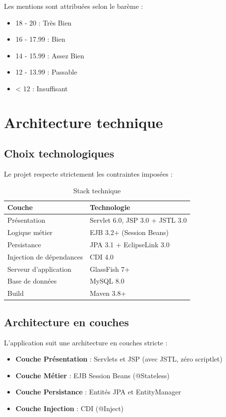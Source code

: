 \documentclass[12pt,a4paper]{report}
\begin{document}
Les mentions sont attribuées selon le barème :
\begin{itemize}
    \item 18 - 20 : Très Bien
    \item 16 - 17.99 : Bien
    \item 14 - 15.99 : Assez Bien
    \item 12 - 13.99 : Passable
    \item < 12 : Insuffisant
\end{itemize}

\chapter{Architecture technique}

\section{Choix technologiques}
Le projet respecte strictement les contraintes imposées :

\begin{table}[h]
\centering
\begin{tabular}{ll}
\toprule
\textbf{Couche} & \textbf{Technologie} \\
\midrule
Présentation & Servlet 6.0, JSP 3.0 + JSTL 3.0 \\
Logique métier & EJB 3.2+ (Session Beans) \\
Persistance & JPA 3.1 + EclipseLink 3.0 \\
Injection de dépendances & CDI 4.0 \\
Serveur d'application & GlassFish 7+ \\
Base de données & MySQL 8.0 \\
Build & Maven 3.8+ \\
\bottomrule
\end{tabular}
\caption{Stack technique}
\end{table}

\section{Architecture en couches}
L'application suit une architecture en couches stricte :

\begin{itemize}
    \item \textbf{Couche Présentation} : Servlets et JSP (avec JSTL, zéro scriptlet)
    \item \textbf{Couche Métier} : EJB Session Beans (@Stateless)
    \item \textbf{Couche Persistance} : Entités JPA et EntityManager
    \item \textbf{Couche Injection} : CDI (@Inject)
\end{itemize}
\end{document}
